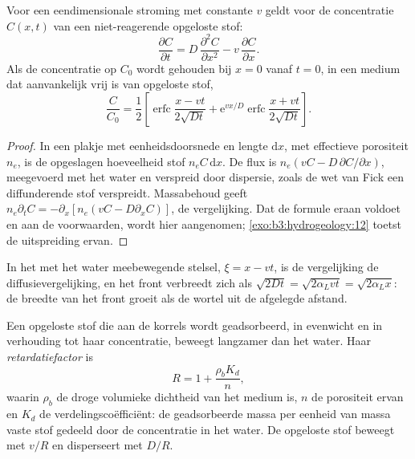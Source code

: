 \begin{theorem}\label{thm:b3:hydrogeology:ade}
Voor een eendimensionale stroming met constante  $v$ geldt voor de
concentratie $C(x, t)$ van een niet-reagerende opgeloste stof:
\[
\frac{\partial C}{\partial t} = D\,\frac{\partial^2C}{\partial x^2} -
v\,\frac{\partial C}{\partial x} .
\]
Als de concentratie op $C_0$ wordt gehouden bij $x = 0$ vanaf $t = 0$, in een medium
dat aanvankelijk vrij is van opgeloste stof,
\[
\frac{C}{C_0} = \frac12\left[\operatorname{erfc}\frac{x - vt}{2\sqrt{Dt}} +
\mathrm e^{vx/D}\operatorname{erfc}\frac{x + vt}{2\sqrt{Dt}}\right] .
\]
\end{theorem}

\begin{proof}
In een plakje met eenheidsdoorsnede en lengte $\mathrm dx$, met effectieve
porositeit $n_e$, is de opgeslagen hoeveelheid stof $n_eC\,\mathrm dx$. De flux is
$n_e(vC - D\,\partial C/\partial x)$, meegevoerd met het water en verspreid door
dispersie, zoals de wet van Fick een diffunderende stof verspreidt. Massabehoud geeft
$n_e\partial_tC = -\partial_x[n_e(vC - D\partial_xC)]$, de vergelijking. Dat
de formule eraan voldoet en aan de voorwaarden, wordt hier aangenomen;
\cref{exo:b3:hydrogeology:12} toetst de uitspreiding ervan.
\end{proof}

In het met het water meebewegende stelsel, $\xi = x - vt$, is de vergelijking de
diffusievergelijking, en het front verbreedt zich als $\sqrt{2Dt} = \sqrt{2\alpha_L
vt} = \sqrt{2\alpha_Lx}$: de breedte van het front groeit als de wortel
uit de afgelegde afstand.

\begin{definition}[Retardatiefactor]\label{def:b3:hydrogeology:retardation}
Een opgeloste stof die aan de korrels wordt geadsorbeerd, in evenwicht en in verhouding
tot haar concentratie, beweegt langzamer dan het water. Haar
\emph{retardatiefactor} is
\[
R = 1 + \frac{\rho_bK_d}{n} ,
\]
waarin $\rho_b$ de droge volumieke dichtheid van het medium is, $n$ de porositeit ervan en
$K_d$ de verdelingscoëfficiënt: de geadsorbeerde massa per eenheid van massa vaste stof
gedeeld door de concentratie in het water. De opgeloste stof beweegt met $v/R$
en disperseert met $D/R$.
\end{definition}

